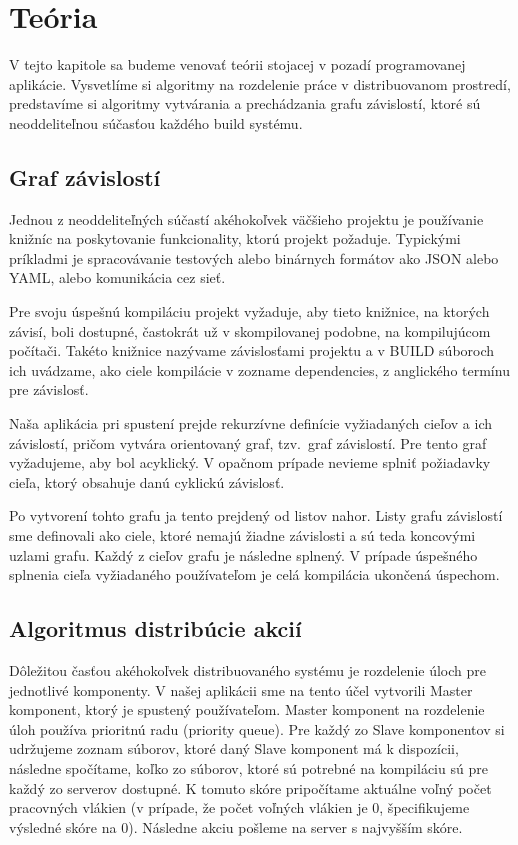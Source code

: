 \chapter{Te\'{o}ria}
\label{ch:theory}

V tejto kapitole sa budeme venovať teórii stojacej v pozadí programovanej aplikácie.
Vysvetlíme si algoritmy na rozdelenie práce v distribuovanom prostredí, predstavíme
si algoritmy vytvárania a prechádzania grafu závislostí, ktoré sú neoddeliteľnou
súčasťou každého build systému.

\section{Graf z\'{a}vislost\'{i}}
\label{sec:depgraph}

Jednou z neoddeliteľných súčastí akéhokoľvek väčšieho projektu je používanie knižníc
na poskytovanie funkcionality, ktorú projekt požaduje. Typickými príkladmi je spracovávanie
testových alebo binárnych formátov ako JSON alebo YAML, alebo komunikácia cez sieť.

Pre svoju úspešnú kompiláciu projekt vyžaduje, aby tieto knižnice, na ktorých závisí,
boli dostupné, častokrát už v skompilovanej podobne, na kompilujúcom počítači. Takéto
knižnice nazývame závislosťami projektu a v BUILD súboroch ich uvádzame, ako ciele
kompilácie v zozname dependencies, z anglického termínu pre závislosť.

Naša aplikácia pri spustení prejde rekurzívne definície vyžiadaných cieľov a ich závislostí,
pričom vytvára orientovaný graf, tzv.\ graf závislostí. Pre tento graf vyžadujeme, aby bol
acyklický. V opačnom prípade nevieme splniť požiadavky cieľa, ktorý obsahuje danú
cyklickú závislosť.

Po vytvorení tohto grafu ja tento prejdený od listov nahor. Listy grafu závislostí
sme definovali ako ciele, ktoré nemajú žiadne závislosti a sú teda koncovými uzlami
grafu. Každý z cieľov grafu je následne splnený. V prípade úspešného splnenia cieľa vyžiadaného
používateľom je celá kompilácia ukončená úspechom.

\section{Algoritmus distrib\'{u}cie akci\'{i}}
\label{sec:actiondistrib}

Dôležitou časťou akéhokoľvek distribuovaného systému je rozdelenie úloch pre jednotlivé
komponenty. V našej aplikácii sme na tento účel vytvorili Master komponent, ktorý
je spustený používateľom. Master komponent na rozdelenie úloh používa prioritnú radu
(priority queue). Pre každý zo Slave komponentov si udržujeme zoznam súborov, ktoré
daný Slave komponent má k dispozícii, následne spočítame, koľko zo súborov, ktoré
sú potrebné na kompiláciu sú pre každý zo serverov dostupné. K tomuto skóre pripočítame
aktuálne voľný počet pracovných vlákien (v prípade, že počet voľných vlákien je 0, špecifikujeme
výsledné skóre na 0). Následne akciu pošleme na server s najvyšším skóre.
